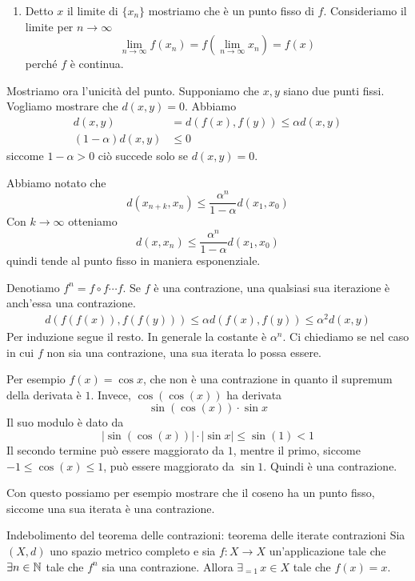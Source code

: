 \documentclass[a4paper]{article}
\begin{document}
\begin{snippetproof}{}
\begin{enumerate}
        e la serie geometrica converge.
        \item Detto \(x\) il limite di \(\{x_n\}\) mostriamo che è un punto fisso di \(f\).
        Consideriamo il limite per \(n\to \infty\)
        \[
            \lim_{n \to \infty} f(x_n) = f\left(\lim_{n \to \infty} x_n\right)
            = f(x)
        \]
        perché \(f\) è continua.
    \end{enumerate}
    Mostriamo ora l'unicità del punto.
    Supponiamo che \(x,y\) siano due punti fissi. Vogliamo mostrare che \(d(x,y) = 0\).
    Abbiamo
    \begin{align*}
        d(x,y) &= d(f(x), f(y)) \leq \alpha d(x,y) \\
        (1-\alpha) d(x,y) &\leq 0
    \end{align*}
    siccome \(1-\alpha > 0\) ciò succede solo se \(d(x,y) = 0\).
\end{snippetproof}

Abbiamo notato che
\[
    d(x_{n+k}, x_n) \leq \frac{\alpha^n}{1 - \alpha} d(x_1, x_0)
\]
Con \(k \to \infty\) otteniamo
\[
    d(x, x_n) \leq \frac{\alpha^n}{1 - \alpha} d(x_1, x_0)
\]
quindi tende al punto fisso in maniera esponenziale.

Denotiamo \(f^n = f \circ f \cdots f\).
Se \(f\) è una contrazione, una qualsiasi sua iterazione è anch'essa una contrazione.
\begin{align*}
    d(f(f(x)), f(f(y))) \leq \alpha d(f(x), f(y)) \leq \alpha^2 d(x,y)
\end{align*}
Per induzione segue il resto. In generale la costante è \(\alpha^n\).
Ci chiediamo se nel caso in cui \(f\) non sia una contrazione, una sua iterata lo possa essere.

\begin{snippetexample}{}
    Per esempio \(f(x) = \cos x\), che non è una contrazione in quanto il supremum
    della derivata è \(1\). Invece, \(\cos(\cos(x))\) ha derivata
    \[
        \sin(\cos(x)) \cdot \sin x
    \]
    Il suo modulo è dato da
    \[
        |\sin(\cos(x))| \cdot |\sin x|
        \leq \sin(1) < 1
    \]
    Il secondo termine può essere maggiorato da \(1\), mentre il primo,
    siccome \(-1 \leq \cos(x) \leq 1\), può essere maggiorato da \(\sin 1\).
    Quindi è una contrazione.

    Con questo possiamo per esempio mostrare che il coseno ha un punto fisso,
    siccome una sua iterata è una contrazione.
\end{snippetexample}


\begin{snippetcorollary}{Indebolimento del teorema delle contrazioni: teorema delle iterate contrazioni}
    Sia \((X, d)\) uno spazio metrico completo e sia
    \(f \colon X \to X\) un'applicazione tale che \(\exists n \in \mathbb{N}\)
    tale che \(f^n\) sia una contrazione. Allora \(\exists_{=1}\, x\in X\)
    tale che \(f(x)=x\).
\end{snippetcorollary}
\end{document}
